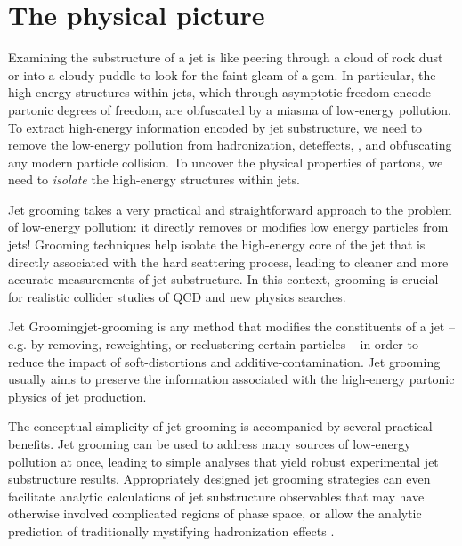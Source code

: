 \section{The physical picture}

Examining the substructure of a jet is like peering through a cloud of rock dust or into a cloudy puddle to look for the faint gleam of a gem.
%
In particular, the high-energy structures within jets, which through \gls{asymptotic-freedom} encode partonic degrees of freedom, are obfuscated by a miasma of low-energy pollution.
%
To extract high-energy information encoded by jet substructure, we need to remove the low-energy pollution from \gls{hadronization}, \gls{deteffects}, , and  obfuscating any modern particle collision.
%
To uncover the physical properties of partons, we need to \textit{isolate} the high-energy structures within jets.


Jet grooming takes a very practical and straightforward approach to the problem of low-energy pollution:
%
it directly removes or modifies low energy particles from jets!
%
Grooming techniques help isolate the high-energy core of the jet that is directly associated with the hard scattering process, leading to cleaner and more accurate measurements of jet substructure.
%
In this context, grooming is crucial for realistic collider studies of QCD and new physics searches.

\begin{definitionbox}{Jet Grooming}{jet-grooming}
     is any method that modifies the constituents of a jet -- e.g. by removing, reweighting, or reclustering certain particles -- in order to reduce the impact of \glspl{soft-distortion} and \gls{additive-contamination}.
    Jet grooming usually aims to preserve the information associated with the high-energy partonic physics of jet production.
\end{definitionbox}

The conceptual simplicity of jet grooming is accompanied by several practical benefits.
%
Jet grooming can be used to address many sources of low-energy pollution at once, leading to simple analyses that yield robust experimental jet substructure results.
%
Appropriately designed jet grooming strategies can even facilitate analytic calculations of jet substructure observables that may have otherwise involved complicated regions of phase space, or allow the analytic prediction of traditionally mystifying \gls{hadronization} effects \cite{Larkoski:2014wba}.


